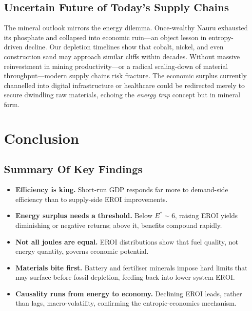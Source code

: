 \documentclass[a4paper,12pt]{article}
\begin{document}
\subsection{Uncertain Future of Today’s Supply Chains}
\label{sec:disc_supply}

The mineral outlook mirrors the energy dilemma.  Once-wealthy Nauru exhausted
its phosphate and collapsed into economic ruin—an object lesson in
entropy-driven decline.  Our depletion timelines show that cobalt, nickel, and
even construction sand may approach similar cliffs within decades.  Without
massive reinvestment in mining productivity—or a radical scaling-down of
material throughput—modern supply chains risk fracture.  The economic surplus
currently channelled into digital infrastructure or healthcare could be
redirected merely to secure dwindling raw materials, echoing the \emph{energy
trap} concept but in mineral form.


\section{Conclusion}
\subsection{Summary Of Key Findings}
\label{sec:disc_synthesis}
\begin{itemize}
\item \textbf{Efficiency is king.}  
  Short-run GDP responds far more to demand-side efficiency than to supply-side
  EROI improvements.

\item \textbf{Energy surplus needs a threshold.}  
  Below \(E^{*}\!\sim\!6\), raising EROI yields diminishing or negative returns;
  above it, benefits compound rapidly.

\item \textbf{Not all joules are equal.}  
  EROI distributions show that fuel quality, not energy quantity, governs economic potential.

\item \textbf{Materials bite first.}  
  Battery and fertiliser minerals impose hard limits that may surface before
  fossil depletion, feeding back into lower system EROI.

\item \textbf{Causality runs from energy to economy.}  
  Declining EROI leads, rather than lags, macro-volatility, confirming the
  entropic-economics mechanism.
\end{itemize}
\end{document}

